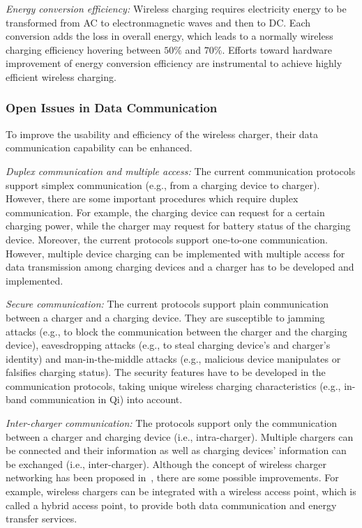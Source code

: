 \documentclass[twocolumn,10pt]{IEEEtran}
\begin{document}
{\em Energy conversion efficiency:} Wireless charging requires electricity energy to be transformed from  AC to electronmagnetic waves and then to DC. Each conversion adds the loss in overall energy, which leads to a normally wireless charging efficiency hovering between $50\%$ and $70 \%$. Efforts toward hardware improvement of energy conversion efficiency are instrumental to achieve highly efficient wireless charging.


\subsubsection{Open Issues in Data Communication}

To improve the usability and efficiency of the wireless charger, their data communication capability can be enhanced. 

{\em Duplex communication and multiple access:} The current communication protocols support simplex communication (e.g., from a charging device to charger). However, there are some important procedures which require duplex communication. For example, the charging device can request for a certain charging power, while the charger may request for battery status of the charging device. Moreover, the current protocols support one-to-one communication. However, multiple device charging can be implemented 
with multiple access for data transmission among charging devices and a charger has to be developed and implemented.

{\em Secure communication:} The current protocols support plain communication between a charger and a charging device. They are susceptible to jamming attacks \cite{D.NiyatoJammingICC,D.NiyatoJammingWCNC}  (e.g., to block the communication between the charger and the charging device), eavesdropping attacks (e.g., to steal charging device's and charger's identity) and man-in-the-middle attacks (e.g., malicious device manipulates or falsifies charging status). The security features have to be developed in the communication protocols, taking unique wireless charging characteristics (e.g., in-band communication in Qi) into account. 

{\em Inter-charger communication:} The protocols support only the communication between a charger and charging device (i.e., intra-charger). Multiple chargers can be connected and their information as well as charging devices' information can be exchanged (i.e., inter-charger). Although  the concept of wireless charger networking has been proposed in~\cite{X.1410.8635Lu}, there are some possible improvements. For example, wireless chargers can be integrated with a wireless access point, which is called a hybrid access point, to provide both data communication and energy transfer services.
\end{document}
